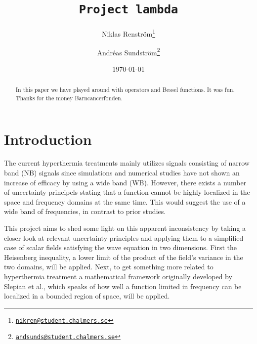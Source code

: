 \documentclass[11pt,a4paper, 
swedish,english %
]{article}
\begin{document}


%


\begin{titlepage}
\title{\tt Project lambda}
\author{Niklas Renström\footnote{\href{mailto:nikren@student.chalmers.se}{\tt nikren@student.chalmers.se}} 
\and Andréas Sundström\footnote{\href{mailto:andsunds@student.chalmers.se}{\tt andsunds@student.chalmers.se}}
}

\date{\today}

\maketitle


\thispagestyle{empty} \pagestyle{empty} %

\begin{abstract} 
In this paper we have played around with operators and Bessel functions. It was fun. Thanks for the money Barncancerfonden.
\end{abstract}
\newpage
\tableofcontents
\end{titlepage}

\setcounter{page}{1}


\section{Introduction}

The current hyperthermia treatments mainly utilizes signals consisting of narrow band (NB) signals since simulations and numerical studies have not shown an increase of efficacy by using a wide band (WB). 
However, there exists a number of uncertainty principels stating that a function cannot be highly localized in the space and frequency domains at the same time. This would suggest the use of a wide band of frequencies, in contrast to prior studies.

This project aims to shed some light on this apparent inconsistency by taking a closer look at relevant uncertainty principles and applying them to a simplified case of scalar fields satisfying the wave equation in two dimensions.
First the Heisenberg inequality, a lower limit of the product of the field's variance in the two domains, will be applied.
Next, to get something more related to hyperthermia treatment a mathematical framework originally developed by Slepian et al., which speaks of how well a function limited in frequency can be localized in a bounded region of space, will be applied.
\end{document}
